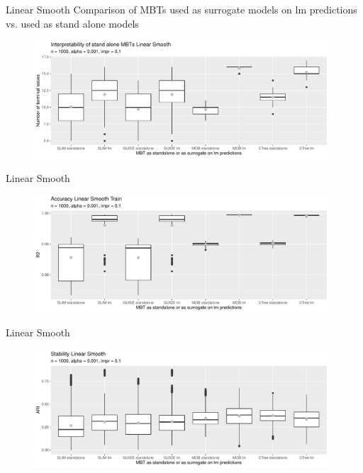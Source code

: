 \documentclass[9pt, xcolor=table]{beamer}
\begin{document}
\begin{frame}{Linear Smooth}
Comparison of MBTs used as surrogate models on lm predictions vs. used as stand alone models 
\begin{figure}
    \includegraphics[width=11cm]{Figures/simulations/batchtools/basic_scenarios/linear_smooth/ls_1000_standalone_lm_int.pdf}
\end{figure}  
\end{frame}

\begin{frame}{Linear Smooth}
\begin{figure}
    \includegraphics[width=11cm]{Figures/simulations/batchtools/basic_scenarios/linear_smooth/ls_1000_standalone_lm_r2_train.pdf}
\end{figure}  
\end{frame}


\begin{frame}{Linear Smooth}

\begin{figure}
    \includegraphics[width=11cm]{Figures/simulations/batchtools/basic_scenarios/linear_smooth/ls_1000_standalone_lm_sta.pdf}
\end{figure}  
\end{frame}
\end{document}
